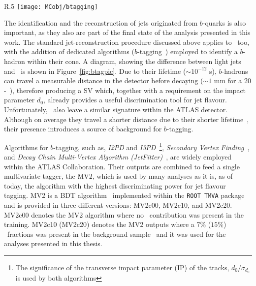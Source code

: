 			\begin{wrapfigure}{R}{.5\textwidth}
				\centering
				\texttt{[image: MCobj/btagging]}
				\caption{\label{fig:btagpic} Diagram showing the common principle of identification of jets initiated by $b$-quark decays~\cite{btagpic}.}
			\end{wrapfigure}

			The identification and the reconstruction of jets originated from $b$-quarks is also important, as they also are part of the final state of the analysis presented in this work. The standard jet-reconstruction procedure discussed above applies to \bjs\, too, with the addition of dedicated algorithms ($b$-tagging~\cite{Aad:2015ydr}) employed to identify a $b$-hadron within their cone. A diagram, showing the difference between light jets and \bjs\, is shown in Figure~\ref{fig:btagpic}. Due to their lifetime ($\sim 10^{-12}$ s), $b$-hadrons can travel a measurable distance in the detector before decaying ($\sim 1$ mm for a $20$-\GeV\ \bj), therefore producing a \ac{SV} which, together with a requirement on the impact parameter $d_0$, already provides a useful discrimination tool for jet flavour. Unfortunately, \cjs\ also leave a similar signature within the \ac{ATLAS} detector. Although on average they travel a shorter distance due to their shorter lifetime~\cite{ATL-PHYS-PUB-2015-001}, their presence introduces a source of background for $b$-tagging. 

			Algorithms for $b$-tagging, such as, \emph{I2PD} and \emph{I3PD}~\cite{Lehmacher:1128662}\footnote{The significance of the transverse impact parameter (IP) of the tracks, $d_0/\sigma_{d_0}$ is used by both algorithms}, \emph{Secondary Vertex Finding}~\cite{ATL-PHYS-PUB-2017-011}, and \emph{Decay Chain Multi-Vertex Algorithm (JetFitter)}~\cite{1742-6596-119-3-032032}, are widely employed within the \ac{ATLAS} Collaboration. Their outputs are combined to feed a single multivariate tagger, the \ac{MV2}, which is used by many analyses as it is, as of today, the algorithm with the highest discriminating power for jet flavour tagging. \ac{MV2} is a \ac{BDT} algorithm~\cite{BDT} implemented within the \texttt{ROOT TMVA} package~\cite{Brun:1997pa, 2007physics3039H} and is provided in three different versions: MV2c00, MV2c10, and MV2c20. MV2c00 denotes the MV2 algorithm where no \cj\ contribution was present in the training. MV2c10 (MV2c20) denotes the MV2 outputs where a $7\%$ ($15\%$) \cj\ fractions was present in the background sample~\cite{Aad:2015ydr} and it was used for the analyses presented in this thesis.

